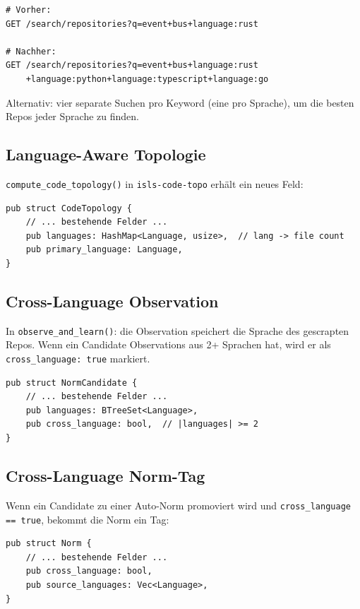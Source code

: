 \documentclass[11pt,a4paper]{article}
\begin{document}
\begin{lstlisting}[style=bash]
# Vorher:
GET /search/repositories?q=event+bus+language:rust

# Nachher:
GET /search/repositories?q=event+bus+language:rust
    +language:python+language:typescript+language:go
\end{lstlisting}

Alternativ: vier separate Suchen pro Keyword (eine pro 
Sprache), um die besten Repos jeder Sprache zu finden.

\subsection{Language-Aware Topologie}

\texttt{compute\_code\_topology()} in \texttt{isls-code-topo} 
erh\"alt ein neues Feld:

\begin{lstlisting}[style=rust]
pub struct CodeTopology {
    // ... bestehende Felder ...
    pub languages: HashMap<Language, usize>,  // lang -> file count
    pub primary_language: Language,
}
\end{lstlisting}

\subsection{Cross-Language Observation}

In \texttt{observe\_and\_learn()}: die Observation speichert 
die Sprache des gescrapten Repos. Wenn ein Candidate 
Observations aus 2+ Sprachen hat, wird er als 
\texttt{cross\_language: true} markiert.

\begin{lstlisting}[style=rust]
pub struct NormCandidate {
    // ... bestehende Felder ...
    pub languages: BTreeSet<Language>,
    pub cross_language: bool,  // |languages| >= 2
}
\end{lstlisting}

\subsection{Cross-Language Norm-Tag}

Wenn ein Candidate zu einer Auto-Norm promoviert wird und 
\texttt{cross\_language == true}, bekommt die Norm ein Tag:

\begin{lstlisting}[style=rust]
pub struct Norm {
    // ... bestehende Felder ...
    pub cross_language: bool,
    pub source_languages: Vec<Language>,
}
\end{lstlisting}
\end{document}
